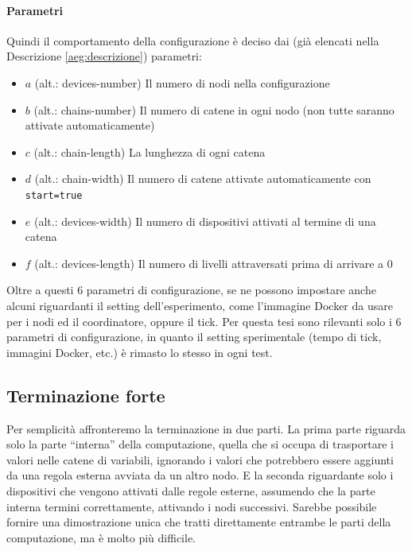\documentclass[12pt, a4paper]{article}
\begin{document}
\paragraph{Parametri}

Quindi il comportamento della configurazione è deciso dai (già elencati nella Descrizione \ref{aeg:descrizione}) parametri:
\begin{itemize}
    \item $a$ (alt.: devices-number) Il numero di nodi nella configurazione
    \item $b$ (alt.: chains-number) Il numero di catene in ogni nodo (non tutte saranno attivate automaticamente)
    \item $c$ (alt.: chain-length) La lunghezza di ogni catena
    \item $d$ (alt.: chain-width) Il numero di catene attivate automaticamente con \lstinline{start=true}
    \item $e$ (alt.: devices-width) Il numero di dispositivi attivati al termine di una catena
    \item $f$ (alt.: devices-length) Il numero di livelli attraversati prima di arrivare a $0$
\end{itemize}

Oltre a questi 6 parametri di configurazione, se ne possono impostare anche alcuni riguardanti il setting dell'esperimento, come l'immagine Docker da usare per i nodi ed il coordinatore, oppure il tick.
Per questa tesi sono rilevanti solo i 6 parametri di configurazione, in quanto il setting sperimentale (tempo di tick, immagini Docker, etc.) è rimasto lo stesso in ogni test.

\subsection{Terminazione forte}

Per semplicità affronteremo la terminazione in due parti. La prima parte riguarda solo la parte ``interna'' della computazione, quella che si occupa di trasportare i valori nelle catene di variabili, ignorando i valori che potrebbero essere aggiunti da una regola esterna avviata da un altro nodo\label{terminazione:premesse:interna}.
E la seconda riguardante solo i dispositivi che vengono attivati dalle regole esterne, assumendo che la parte interna termini correttamente, attivando i nodi successivi\label{terminazione:premesse:esterna}.
Sarebbe possibile fornire una dimostrazione unica che tratti direttamente entrambe le parti della computazione, ma è molto più difficile.
\end{document}
